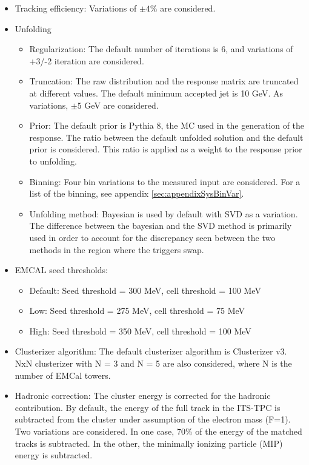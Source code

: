 \begin{itemize}
    \item Tracking efficiency: Variations of $\pm 4\%$ are considered.
    
    \item Unfolding
    \begin{itemize}
        \item Regularization: The default number of iterations is 6, and variations of +3/-2 iteration are considered.
        \item Truncation: The raw distribution and the response matrix are truncated at different values. The default minimum accepted jet \pT is 10 GeV. As variations, $\pm 5$ GeV are considered.
        \item Prior: The default prior is Pythia 8, the MC used in the generation of the response. The ratio between the default unfolded solution and the default prior is considered. This ratio is applied as a weight to the response prior to unfolding.
        \item Binning: Four bin variations to the measured input are considered. For a list of the binning, see appendix \ref{sec:appendixSysBinVar}.
        \item Unfolding method: Bayesian is used by default with SVD as a variation. The difference between the bayesian and the SVD method is primarily used in order to account for the discrepancy seen between the two methods in the region where the triggers swap.
    \end{itemize}

    \item EMCAL seed thresholds:
    \begin{itemize}
        \item Default: Seed threshold = 300 MeV, cell threshold = 100 MeV
        \item Low: Seed threshold = 275 MeV, cell threshold = 75 MeV
        \item High: Seed threshold = 350 MeV, cell threshold = 100 MeV
    \end{itemize}
    
    \item Clusterizer algorithm: The default clusterizer algorithm is Clusterizer v3. NxN clusterizer with N = 3 and N = 5 are also considered, where N is the number of EMCal towers.
    
    \item Hadronic correction: The cluster energy is corrected for the hadronic contribution. By default, the energy of the full track in the ITS-TPC is subtracted from the cluster under assumption of the electron mass (F=1). Two variations are considered. In one case, 70\% of the energy of the matched tracks is subtracted. In the other, the minimally ionizing particle (MIP) energy is subtracted.
    

\end{itemize}
